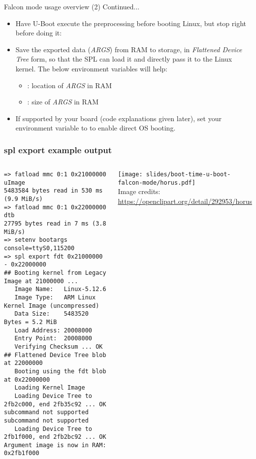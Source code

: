 \begin{frame}{Falcon mode usage overview (2)}
   Continued...
   \begin{itemize}
     \item Have U-Boot execute the preprocessing before booting Linux,
           but stop right before doing it:\\
     \item Save the exported data ({\em ARGS}) from RAM to storage, in {\em Flattened Device
           Tree} form, so that the SPL can load it and directly pass it to
           the Linux kernel. The below environment variables will help:
           \begin{itemize}
                \item {}: location of {\em ARGS} in RAM
                \item {}: size of {\em ARGS} in RAM
           \end{itemize}
     \item If supported by your board (code explanations given later),
           set your  environment variable to 
           to enable direct OS booting.
   \end{itemize}
\end{frame}

\begin{frame}[fragile]
\frametitle{spl export example output}
  \begin{columns}
  \begin{block}{}
  \scriptsize
  \begin{verbatim}
=> fatload mmc 0:1 0x21000000 uImage
5483584 bytes read in 530 ms (9.9 MiB/s)
=> fatload mmc 0:1 0x22000000 dtb
27795 bytes read in 7 ms (3.8 MiB/s)
=> setenv bootargs console=ttyS0,115200
=> spl export fdt 0x21000000 - 0x22000000
## Booting kernel from Legacy Image at 21000000 ...
   Image Name:   Linux-5.12.6
   Image Type:   ARM Linux Kernel Image (uncompressed)
   Data Size:    5483520 Bytes = 5.2 MiB
   Load Address: 20008000
   Entry Point:  20008000
   Verifying Checksum ... OK
## Flattened Device Tree blob at 22000000
   Booting using the fdt blob at 0x22000000
   Loading Kernel Image
   Loading Device Tree to 2fb2c000, end 2fb35c92 ... OK
subcommand not supported
subcommand not supported
   Loading Device Tree to 2fb1f000, end 2fb2bc92 ... OK
Argument image is now in RAM: 0x2fb1f000
  \end{verbatim}
  \end{block}
    \begin{center}
    \vspace{0.5cm}
    \texttt{[image: slides/boot-time-u-boot-falcon-mode/horus.pdf]}\\
    \vspace{0.5cm}
    \tiny Image credits:\\
    \url{https://openclipart.org/detail/292953/horus}
    \end{center}
  \end{columns}
\end{frame}

